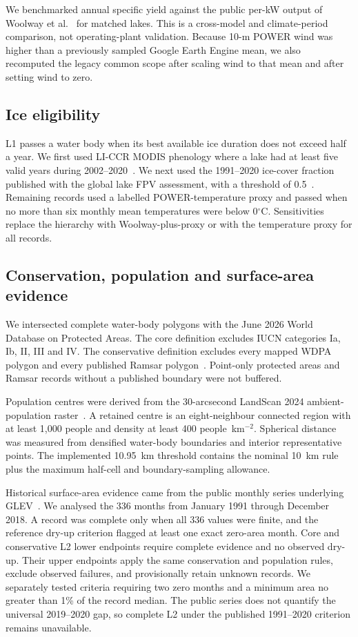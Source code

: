We benchmarked annual specific yield against the public per-kW output of Woolway et al.~\citep{woolway2024} for matched lakes. This is a cross-model and climate-period comparison, not operating-plant validation. Because 10-m POWER wind was higher than a previously sampled Google Earth Engine mean, we also recomputed the legacy common scope after scaling wind to that mean and after setting wind to zero.

\subsection{Ice eligibility}

L1 passes a water body when its best available ice duration does not exceed half a year. We first used LI-CCR MODIS phenology where a lake had at least five valid years during 2002--2020~\citep{jiang2026liccr}. We next used the 1991--2020 ice-cover fraction published with the global lake FPV assessment, with a threshold of 0.5~\citep{woolway2024}. Remaining records used a labelled POWER-temperature proxy and passed when no more than six monthly mean temperatures were below 0$^\circ$C. Sensitivities replace the hierarchy with Woolway-plus-proxy or with the temperature proxy for all records.

\subsection{Conservation, population and surface-area evidence}

We intersected complete water-body polygons with the June 2026 World Database on Protected Areas. The core definition excludes IUCN categories Ia, Ib, II, III and IV. The conservative definition excludes every mapped WDPA polygon and every published Ramsar polygon~\citep{unep2023wdpa,ramsar2026}. Point-only protected areas and Ramsar records without a published boundary were not buffered.

Population centres were derived from the 30-arcsecond LandScan 2024 ambient-population raster~\citep{lebakula2025landscan}. A retained centre is an eight-neighbour connected region with at least 1{,}000 people and density at least 400 people~km$^{-2}$. Spherical distance was measured from densified water-body boundaries and interior representative points. The implemented 10.95~km threshold contains the nominal 10~km rule plus the maximum half-cell and boundary-sampling allowance.

Historical surface-area evidence came from the public monthly series underlying GLEV~\citep{zhao2022glev}. We analysed the 336 months from January 1991 through December 2018. A record was complete only when all 336 values were finite, and the reference dry-up criterion flagged at least one exact zero-area month. Core and conservative L2 lower endpoints require complete evidence and no observed dry-up. Their upper endpoints apply the same conservation and population rules, exclude observed failures, and provisionally retain unknown records. We separately tested criteria requiring two zero months and a minimum area no greater than 1\% of the record median. The public series does not quantify the universal 2019--2020 gap, so complete L2 under the published 1991--2020 criterion remains unavailable.

